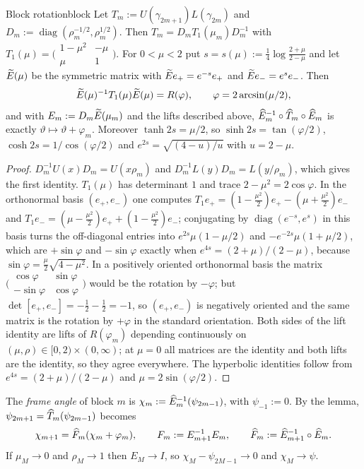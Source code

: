 \begin{boxedlemma}{Block rotation}{block}
Let $T_m:=U(\gamma_{2m+1})L(\gamma_{2m})$ and $D_m:=\operatorname{diag}(\rho_m^{-1/2},\rho_m^{1/2})$.
Then $T_m=D_mT_1(\mu_m)D_m^{-1}$ with
$T_1(\mu)=\bigl(\begin{smallmatrix}1-\mu^2&-\mu\\\mu&1\end{smallmatrix}\bigr)$. For
$0<\mu<2$ put $s=s(\mu):=\tfrac14\log\frac{2+\mu}{2-\mu}$ and let $\widetilde E(\mu)$ be the
symmetric matrix with $\widetilde E e_+=e^{-s}e_+$ and $\widetilde E e_-=e^{s}e_-$. Then
\[
  \widetilde E(\mu)^{-1}T_1(\mu)\widetilde E(\mu)=R(\varphi),\qquad \varphi=2\arcsin(\mu/2),
\]
and with $E_m:=D_m\widetilde E(\mu_m)$ and the lifts described above,
$\widehat E_m^{-1}\circ\widehat T_m\circ\widehat E_m$ is exactly $\vartheta\mapsto\vartheta+\varphi_m$.
Moreover $\tanh2s=\mu/2$, so $\sinh2s=\tan(\varphi/2)$, $\cosh2s=1/\cos(\varphi/2)$
and $e^{2s}=\sqrt{(4-u)/u}$ with $u=2-\mu$.
\end{boxedlemma}

\begin{proof}
$D_m^{-1}U(x)D_m=U(x\rho_m)$ and $D_m^{-1}L(y)D_m=L(y/\rho_m)$, which gives the first
identity. $T_1(\mu)$ has determinant $1$ and trace $2-\mu^2=2\cos\varphi$. In the
orthonormal basis $(e_+,e_-)$ one computes
$T_1e_+=(1-\tfrac{\mu^2}{2})e_+-(\mu+\tfrac{\mu^2}{2})e_-$ and
$T_1e_-=(\mu-\tfrac{\mu^2}{2})e_++(1-\tfrac{\mu^2}{2})e_-$; conjugating by
$\operatorname{diag}(e^{-s},e^{s})$ in this basis turns the off-diagonal entries into
$e^{2s}\mu(1-\mu/2)$ and $-e^{-2s}\mu(1+\mu/2)$, which are $+\sin\varphi$ and
$-\sin\varphi$ exactly when $e^{4s}=(2+\mu)/(2-\mu)$, because
$\sin\varphi=\tfrac{\mu}{2}\sqrt{4-\mu^2}$. In a positively oriented orthonormal basis the matrix
$\bigl(\begin{smallmatrix}\cos\varphi&\sin\varphi\\-\sin\varphi&\cos\varphi\end{smallmatrix}\bigr)$ would be the
rotation by $-\varphi$; but $\det[e_+,e_-]=-\frac12-\frac12=-1$, so $(e_+,e_-)$ is negatively oriented and
the same matrix is the rotation by $+\varphi$ in the standard orientation. Both sides of the lift identity are lifts of $R(\varphi_m)$
depending continuously on $(\mu,\rho)\in[0,2)\times(0,\infty)$; at $\mu=0$ all matrices
are the identity and both lifts are the identity, so they agree everywhere. The
hyperbolic identities follow from $e^{4s}=(2+\mu)/(2-\mu)$ and $\mu=2\sin(\varphi/2)$.
\end{proof}

The \emph{frame angle} of block $m$ is $\chi_m:=\widehat E_m^{-1}(\psi_{2m-1})$, with
$\psi_{-1}:=0$. By the lemma, $\psi_{2m+1}=\widehat T_m(\psi_{2m-1})$ becomes
\begin{equation}\label{eq:frame-recursion}
  \chi_{m+1}=\widehat F_m(\chi_m+\varphi_m),\qquad F_m:=E_{m+1}^{-1}E_m,\qquad
  \widehat F_m:=\widehat E_{m+1}^{-1}\circ\widehat E_m .
\end{equation}
If $\mu_M\to0$ and $\rho_M\to1$ then $E_M\to I$, so $\chi_M-\psi_{2M-1}\to0$ and
$\chi_M\to\psi$.

